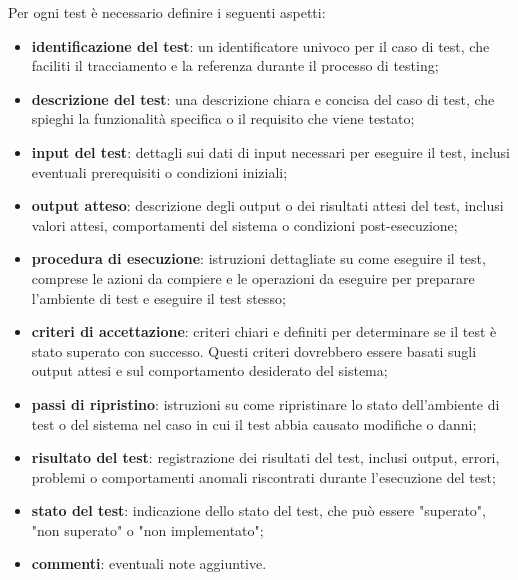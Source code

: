 Per ogni test è necessario definire i seguenti aspetti:
\begin{itemize}
	\item \textbf{identificazione del test}: un identificatore univoco per il caso di test, che faciliti il tracciamento e la referenza durante il processo di testing;
	\item \textbf{descrizione del test}: una descrizione chiara e concisa del caso di test, che spieghi la funzionalità specifica o il requisito che viene testato;
	\item \textbf{input del test}: dettagli sui dati di input necessari per eseguire il test, inclusi eventuali prerequisiti o condizioni iniziali;
	\item \textbf{output atteso}: descrizione degli output o dei risultati attesi del test, inclusi valori attesi, comportamenti del sistema o condizioni post-esecuzione;
	\item \textbf{procedura di esecuzione}: istruzioni dettagliate su come eseguire il test, comprese le azioni da compiere e le operazioni da eseguire per preparare l'ambiente di test e eseguire il test stesso;
	\item \textbf{criteri di accettazione}: criteri chiari e definiti per determinare se il test è stato superato con successo. Questi criteri dovrebbero essere basati sugli output attesi e sul comportamento desiderato del sistema;
	\item \textbf{passi di ripristino}: istruzioni su come ripristinare lo stato dell'ambiente di test o del sistema nel caso in cui il test abbia causato modifiche o danni;
	\item \textbf{risultato del test}: registrazione dei risultati del test, inclusi output, errori, problemi o comportamenti anomali riscontrati durante l'esecuzione del test;
	\item \textbf{stato del test}: indicazione dello stato del test, che può essere "superato", "non superato" o "non implementato";
	\item \textbf{commenti}: eventuali note aggiuntive.
\end{itemize}

